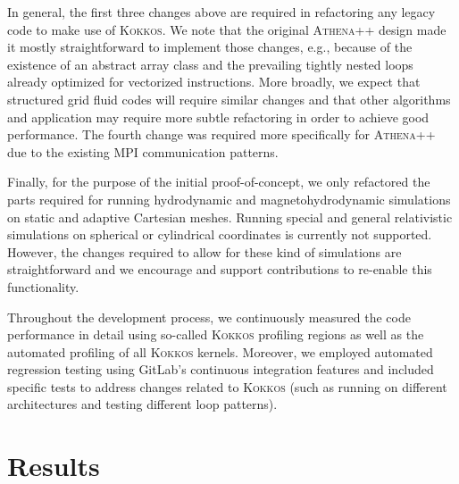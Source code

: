 \documentclass[10pt,journal,compsoc]{IEEEtran}
\newcommand{\textcode}[1]{\textsc{#1}}
\newcommand{\kokkos}{\textcode{Kokkos}\xspace}
\newcommand{\athena}{\textcode{Athena++}\xspace}
\newcommand{\mpi}{\textcode{MPI}\xspace}
\begin{document}
In general, the first three changes above are required in refactoring any legacy code
to make use of \kokkos.
We note that the original \athena design made it mostly straightforward to
implement those changes, e.g., because of the existence of an abstract array class and
the prevailing tightly nested loops already optimized for vectorized instructions.
More broadly, we expect that structured grid fluid codes will require similar changes
and that other algorithms and application may require more subtle refactoring in
order to achieve good performance.
The fourth change was required more specifically for \athena due to the 
existing \mpi communication patterns.

Finally, for the purpose of the initial proof-of-concept, we only refactored the parts
required for running hydrodynamic and magnetohydrodynamic simulations on 
static and adaptive Cartesian meshes.
Running special and general relativistic simulations on
spherical or cylindrical coordinates is currently not supported.
However, the changes required to allow for these kind of simulations are straightforward
and we encourage and support contributions to re-enable this functionality.

Throughout the development process, we continuously measured the code performance
in detail using so-called \kokkos profiling regions as well as the automated
profiling of all \kokkos kernels.
Moreover, we employed automated regression testing using GitLab's continuous 
integration features and included specific tests to address changes related to \kokkos
(such as running on different architectures and testing different loop patterns).

\section{Results}
\label{sec:results}
\end{document}
